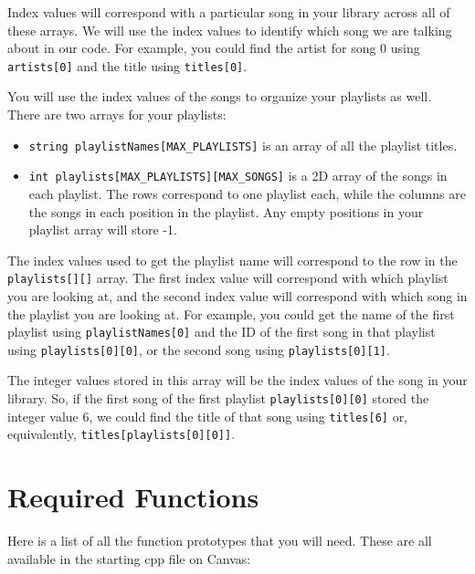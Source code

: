 Index values will correspond with a particular song in your library across all of these arrays. We will use the index values to identify which song we are talking about in our code. For example, you could find the artist for song 0 using \texttt{artists[0]} and the title using \texttt{titles[0]}.

You will use the index values of the songs to organize your playlists as well. There are two arrays for your playlists:

\begin{itemize}
    \item \texttt{string playlistNames[MAX_PLAYLISTS]} is an array of all the playlist titles. 
    \item \texttt{int playlists[MAX_PLAYLISTS][MAX_SONGS]} is a 2D array of the songs in each playlist. The rows correspond to one playlist each, while the columns are the songs in each position in the playlist. Any empty positions in your playlist array will store -1.  
\end{itemize}

The index values used to get the playlist name will correspond to the row in the \texttt{playlists[][]} array. The first index value will correspond with which playlist you are looking at, and the second index value will correspond with which song in the playlist you are looking at. For example, you could get the name of the first playlist using \texttt{playlistNames[0]} and the ID of the first song in that playlist using \texttt{playlists[0][0]}, or the second song using \texttt{playlists[0][1]}. 

The integer values stored in this array will be the index values of the song in your library. So, if the first song of the first playlist \texttt{playlists[0][0]} stored the integer value 6, we could find the title of that song using \texttt{titles[6]} or, equivalently, \texttt{titles[playlists[0][0]]}.

\section{Required Functions}
Here is a list of all the function prototypes that you will need. These are all available in the starting cpp file on Canvas:

